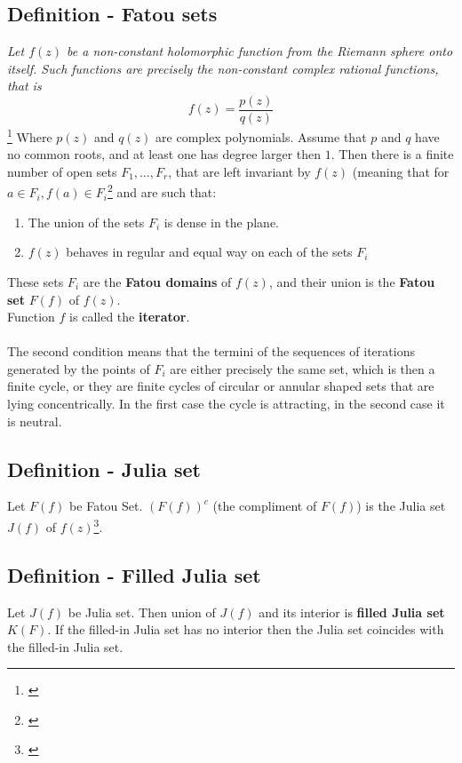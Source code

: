 \documentclass{article}
\begin{document}
\subsection{Definition - Fatou sets}
\textit{Let $f(z)$ be a non-constant holomorphic function from the Riemann sphere onto itself. Such functions are precisely the non-constant complex rational functions, that is}
\begin{equation}
	f(z) = \frac{p(z)}{q(z)}
\end{equation}\footnote{\cite{zotero-24}}
Where $p(z)$ and $q(z)$ are complex polynomials. Assume that $p$ and $q$ have no common roots, and at least one has degree larger then $1$. Then there is a finite number of open sets $F_{1},\ldots,F_{r}$, that are left invariant by $f(z)$ (meaning that for $a\in F_{i}, f(a)\in F_{i}$\footnote{\cite{Weisstein}} and are such that:
\begin{enumerate}
	\item The union of the sets $F_{i}$ is dense in the plane.
	\item $f(z)$ behaves in regular and equal way on each of the sets $F_{i}$
\end{enumerate}
These sets $F_{i}$ are the \textbf{Fatou domains} of $f(z)$, and their union is the \textbf{Fatou set} $F(f)$ of $f(z)$.\\
Function $f$ is called the \textbf{iterator}.
\\[1\baselineskip]
\\[1\baselineskip]
The second condition means that the termini of the sequences of iterations generated by the points of $F_{i}$ are either precisely the same set, which is then a finite cycle, or they are finite cycles of circular or annular shaped sets that are lying concentrically. In the first case the cycle is attracting, in the second case it is neutral.

\subsection{Definition - Julia set}
Let $F(f)$ be Fatou Set. $(F(f))^{c}$ (the compliment of $F(f)$) is the Julia set $J(f)$ of $f(z)$\footnote{\cite{zotero-24}}.

\subsection{Definition - Filled Julia set}
Let $J(f)$ be Julia set. Then union of $J(f)$ and its interior is \textbf{filled Julia set} $K(F)$. If the filled-in Julia set has no interior then the Julia set coincides with the filled-in Julia set\cite{zotero-3}.
\end{document}
